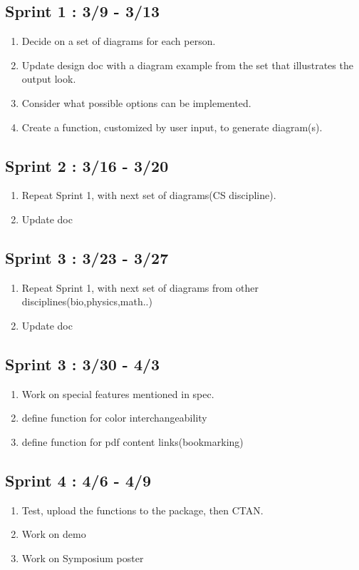 \documentclass[10pt,a4paper,english]{article}
\begin{document}
\subsection{Sprint 1 : 3/9 - 3/13}
\begin{enumerate}
\item Decide on a set of diagrams for each person.
\item Update design doc with a diagram example from the set that illustrates the output look.
\item Consider what possible options can be implemented.
\item Create a function, customized by user input, to generate diagram(s).
\end{enumerate}
\subsection{Sprint 2 : 3/16 - 3/20}
\begin{enumerate}
\item Repeat Sprint 1, with next set of diagrams(CS discipline).
\item Update doc
\end{enumerate}
\subsection{Sprint 3 : 3/23 - 3/27}
\begin{enumerate} 
\item Repeat Sprint 1, with next set of diagrams from other disciplines(bio,physics,math..)
\item Update doc
\end{enumerate}
\subsection{Sprint 3 : 3/30 - 4/3}
\begin{enumerate}
\item Work on special features mentioned in spec.
\item define function for color interchangeability
\item define function for pdf content links(bookmarking)
\end{enumerate}
\subsection{Sprint 4 : 4/6 - 4/9}
\begin{enumerate}
\item Test, upload the functions to the package, then CTAN.
\item Work on demo
\item Work on Symposium poster
\end{enumerate}
\end{document}
